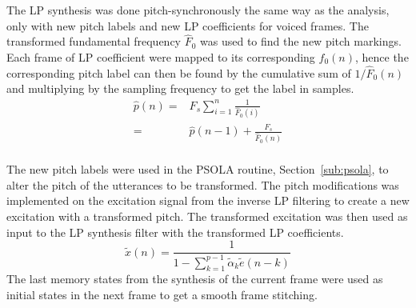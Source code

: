 The LP synthesis was done pitch-synchronously the same way as the analysis, only with new pitch labels and new LP coefficients for voiced frames. The transformed fundamental frequency $\hat{F}_0$ was used to find the new pitch markings. Each frame of LP coefficient were mapped to its corresponding $f_0(n)$, hence the corresponding pitch label can then be found by the cumulative sum of $1/\hat{F}_0(n)$ and multiplying by the sampling frequency to get the label in samples.
\begin{equation}
	\begin{split}
		\hat{p}(n) =& F_s \sum_{i=1}^{n}\frac{1}{\hat{F}_0(i)} \\
		 =& \hat{p}(n-1) + \frac{F_s}{\hat{F}_0(n)} \\
	\end{split}
\end{equation}

The new pitch labels were used in the PSOLA routine, Section~\ref{sub:psola}, to alter the pitch of the utterances to be transformed. The pitch modifications was implemented on the excitation signal from the inverse LP filtering to create a new excitation with a transformed pitch. The transformed excitation was then used as input to the LP synthesis filter with the transformed LP coefficients. 
\begin{equation}
	\tilde{x}(n) = \frac{1}{1 - \sum_{k=1}^{p-1} \tilde{\alpha}_k \tilde{e}(n-k)}
\end{equation}
The last memory states from the synthesis of the current frame were used as initial states in the next frame to get a smooth frame stitching.



